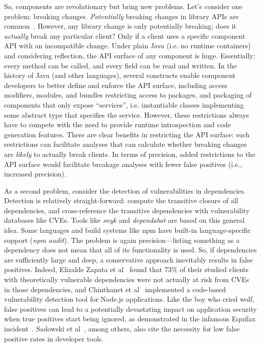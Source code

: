 So, components are revolutionary but bring new problems. Let's consider one problem: breaking changes. \textit{Potentially} breaking changes in library APIs are common~\cite{dietrich2014broken,raemaekers2014semantic}. However, any library change is only potentially breaking; does it \textit{actually} break any particular client? Only if a client uses a specific component API with an incompatible change. Under plain Java (i.e. no runtime containers) and considering reflection, the API surface of any component is huge. Essentially: every method can be called, and every field can be read and written. In the history of Java (and other languages), several constructs enable component developers to better define and enforce the API surface, including access modifiers, modules, and bundles restricting access to packages, and packaging of components that only expose ``services'', i.e. instantiable classes implementing some abstract type that specifies the service. However, these restrictions always have to compete with the need to provide runtime introspection and code generation features. There are clear benefits in restricting the API surface: such restrictions can facilitate analyses that can calculate whether breaking changes are \textit{likely} to actually break clients.  In terms of precision, added restrictions to the API surface would facilitate breakage analyses with fewer false positives (i.e., increased precision). 

As a second problem, consider the detection of vulnerabilities in dependencies. Detection is relatively straight-forward: compute the transitive closure of all dependencies, and cross-reference the transitive dependencies with vulnerability databases like CVEs. Tools like \textit{snyk} and \textit{dependabot} are based on this general idea. Some languages and build systems like npm have built-in language-specific support (\textit{npm audit}). The problem is again precision---listing something as a dependency does not mean that all of its functionality is used. So, if dependencies are sufficiently large and deep, a conservative approach inevitably results in false positives. Indeed, Elizalde Zapata et al~\cite{elizalde18:_towar_smoot_librar_migrat} found that 73\% of their studied clients with theoretically vulnerable dependencies were not actually at risk from CVEs in those dependencies, and Chinthanet et al~\cite{chinthanet20:_code_based_vulner_detec_node} implemented a code-based vulnerability detection tool for Node.js applications. Like the boy who cried wolf, false positives can lead to a potentially devastating impact on application security when true positives start being ignored, as demonstrated in the infamous Equifax incident~\cite{luszcz2018apache}. Sadowski et al~\cite{sadowski2018lessons}, among others, also cite the necessity for low false positive rates in developer tools.

